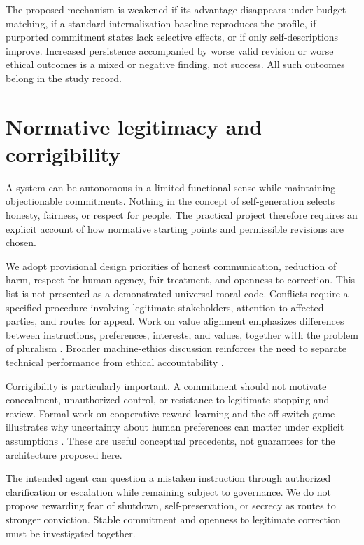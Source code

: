 \documentclass[11pt]{article}
\begin{document}
The proposed mechanism is weakened if its advantage disappears under budget matching, if a standard internalization baseline reproduces the profile, if purported commitment states lack selective effects, or if only self-descriptions improve. Increased persistence accompanied by worse valid revision or worse ethical outcomes is a mixed or negative finding, not success. All such outcomes belong in the study record.

\section{Normative legitimacy and corrigibility}

A system can be autonomous in a limited functional sense while maintaining objectionable commitments. Nothing in the concept of self-generation selects honesty, fairness, or respect for people. The practical project therefore requires an explicit account of how normative starting points and permissible revisions are chosen.

We adopt provisional design priorities of honest communication, reduction of harm, respect for human agency, fair treatment, and openness to correction. This list is not presented as a demonstrated universal moral code. Conflicts require a specified procedure involving legitimate stakeholders, attention to affected parties, and routes for appeal. Work on value alignment emphasizes differences between instructions, preferences, interests, and values, together with the problem of pluralism \cite{Gabriel2020}. Broader machine-ethics discussion reinforces the need to separate technical performance from ethical accountability \cite{MachineEthicsSEP}.

Corrigibility is particularly important. A commitment should not motivate concealment, unauthorized control, or resistance to legitimate stopping and review. Formal work on cooperative reward learning and the off-switch game illustrates why uncertainty about human preferences can matter under explicit assumptions \cite{HadfieldMenell2016,OffSwitch2017}. These are useful conceptual precedents, not guarantees for the architecture proposed here.

The intended agent can question a mistaken instruction through authorized clarification or escalation while remaining subject to governance. We do not propose rewarding fear of shutdown, self-preservation, or secrecy as routes to stronger conviction. Stable commitment and openness to legitimate correction must be investigated together.
\end{document}
